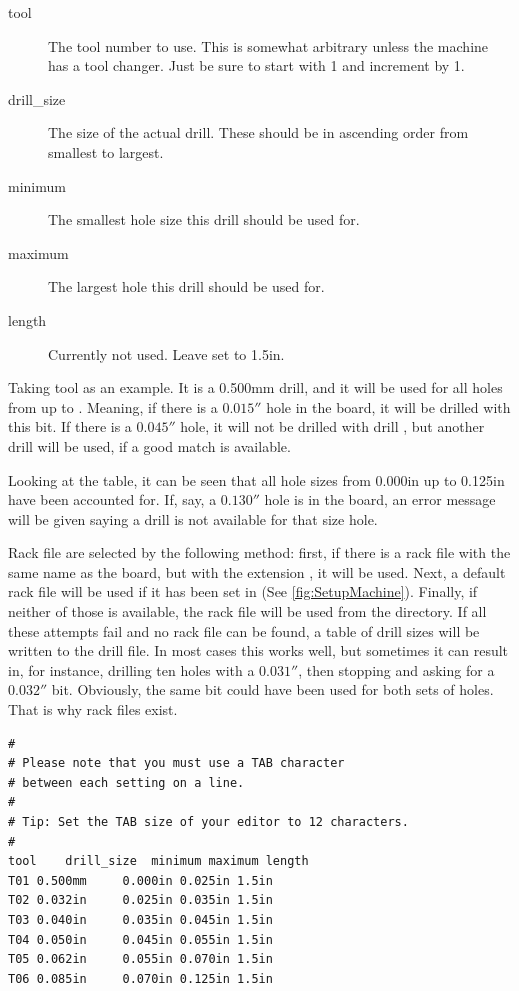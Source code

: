 \documentclass[11pt]{book}
\begin{document}
\begin{description}
	\item[tool] The tool number to use. This is somewhat arbitrary unless the machine has a tool changer. Just be sure to start with 1 and increment by 1.
	\item[drill\_size] The size of the actual drill. These should be in ascending order from smallest to largest.
	\item[minimum] The smallest hole size this drill should be used for.
	\item[maximum] The largest hole this drill should be used for.
	\item[length] Currently not used. Leave set to 1.5in.
\end{description}

Taking tool  as an example. It is a 0.500mm drill, and it will be used for all holes from \code{0.000in} up to \code{0.025in}. Meaning, if there is a $0.015''$ hole in the board, it will be drilled with this bit. If there is a $0.045''$ hole, it will not be drilled with drill , but another drill will be used, if a good match is available.

Looking at the table, it can be seen that all hole sizes from 0.000in up to 0.125in have been accounted for. If, say, a $0.130''$ hole is in the board, an error message will be given saying a drill is not available for that size hole.

Rack file are selected by the following method: first, if there is a rack file with the same name as the board, but with the extension , it will be used. Next, a default rack file will be used if it has been set in  (See \figurename \vref{fig:SetupMachine}). Finally, if neither of those is available, the rack file  will be used from the  directory. If all these attempts fail and no rack file can be found, a table of drill sizes will be written to the drill file. In most cases this works well, but sometimes it can result in, for instance, drilling ten holes with a $0.031''$, then stopping and asking for a $0.032''$ bit. Obviously, the same bit could have been used for both sets of holes. That is why rack files exist.


\begin{lstlisting}[caption={Sample Rack File},label={lst:SampleRackFile}]
#
# Please note that you must use a TAB character
# between each setting on a line.
# 
# Tip: Set the TAB size of your editor to 12 characters.
#
tool	drill_size	minimum	maximum	length
T01	0.500mm		0.000in	0.025in	1.5in
T02	0.032in		0.025in	0.035in	1.5in
T03	0.040in		0.035in	0.045in	1.5in
T04	0.050in		0.045in	0.055in	1.5in
T05	0.062in		0.055in	0.070in	1.5in
T06	0.085in		0.070in	0.125in	1.5in
\end{lstlisting}
\end{document}
